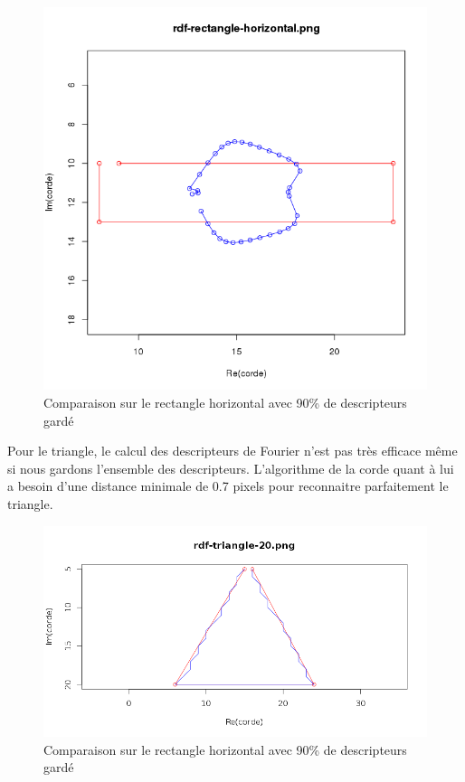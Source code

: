 \documentclass[11pt]{article}
\begin{document}
  \begin{center}
    \begin{figure}[!h]
      \includegraphics[width=13cm]{../resultat/comp_rate_rect.png}
      \caption{Comparaison sur le rectangle horizontal avec 90\% de descripteurs gardé}
    \end{figure}
  \end{center}
  
  \newpage
  
  Pour le triangle, le calcul des descripteurs de Fourier n'est pas très efficace même si nous gardons
  l'ensemble des descripteurs. L'algorithme de la corde quant à lui a besoin d'une distance minimale de 0.7 pixels pour
  reconnaitre parfaitement le triangle.
  
  \begin{center}
    \begin{figure}[!h]
      \includegraphics[width=15cm]{../resultat/comp_triangle.png}
      \caption{Comparaison sur le rectangle horizontal avec 90\% de descripteurs gardé}
    \end{figure}
  \end{center}
  
\end{document}
